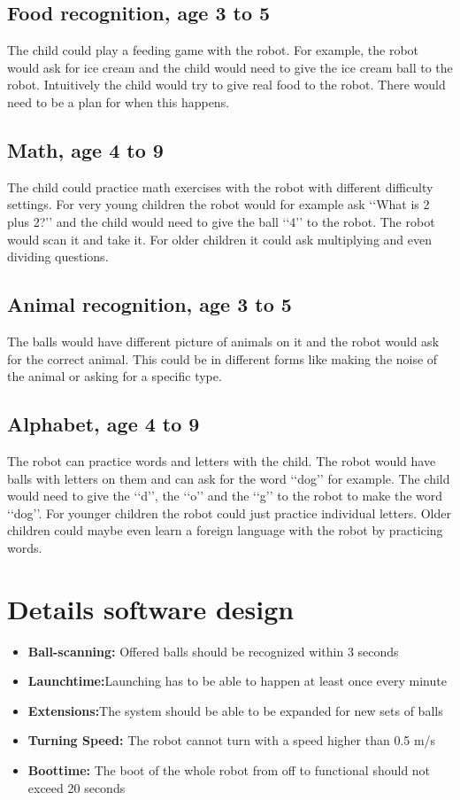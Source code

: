 \documentclass[11pt,twoside,a4paper]{report}
\begin{document}
\begin{appendices}
\section{Food recognition, age 3 to 5}
The child could play a feeding game with the robot. For example, the robot would ask for ice cream and the child would need to give the ice cream ball to the robot. Intuitively the child would try to give real food to the robot. There would need to be a plan for when this happens.
\section{Math, age 4 to 9}
The child could practice math exercises with the robot with different difficulty settings. For very young children the robot would for example ask \lq\lq{}What is 2 plus 2?\rq\rq{} and the child would need to give the ball \lq\lq{}4\rq\rq{} to the robot. The robot would scan it and take it. For older children it could ask multiplying and even dividing questions.
\section{Animal recognition, age 3 to 5}
The balls would have different picture of animals on it and the robot would ask for the correct animal. This could be in different forms like making the noise of the animal or asking for a specific type.
\section{Alphabet, age 4 to 9}
The robot can practice words and letters with the child. The robot would have balls with letters on them and can ask for the word \lq\lq{}dog\rq\rq{} for example. The child would need to give the \lq\lq{}d\rq\rq{}, the \lq\lq{}o\rq\rq{} and the \lq\lq{}g\rq\rq{} to the robot to make the word \lq\lq{}dog\rq\rq{}. For younger children the robot could just practice individual letters. Older children could maybe even learn a foreign language with the robot by practicing words.
\label{appendix:games}

\chapter{Details software design}
\begin{itemize}
\item \textbf{Ball-scanning:} Offered balls should be recognized within 3 seconds
\item\textbf{Launchtime:}Launching has to be able to happen at least once every minute
\item\textbf{Extensions:}The system should be able to be expanded for new sets of balls
\item\textbf{Turning Speed:} The robot cannot turn with a speed higher than 0.5 m/s
\item\textbf{Boottime:} The boot of the whole robot from off to functional should not exceed 20 seconds
\end{itemize}
\label{appendix:software}


\end{appendices}
\end{document}
